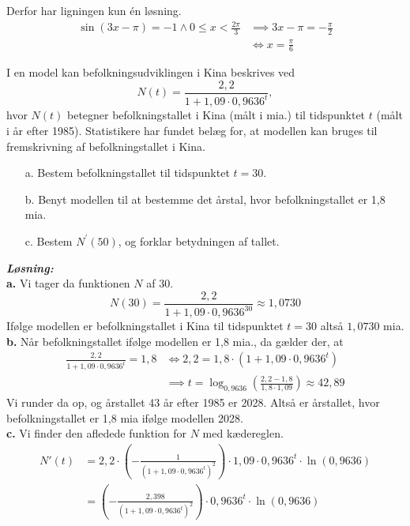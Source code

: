 \documentclass{article}
\newcommand{\sol}{\setlength{\parindent}{0cm}\textbf{\textit{Løsning:}}\setlength{\parindent}{1cm}}
\begin{document}
Derfor har ligningen kun én løsning.
\begin{equation*}
\begin{split}
  \sin \left(3x-\pi\right) =-1\land 0\leq x < \frac{2\pi}{3} &\implies 3x-\pi=-\frac{\pi}{2}\\ 
  &\iff x=\frac{\pi}{6}
\end{split}
\end{equation*}
\begin{question}{}{}
  I en model kan befolkningsudviklingen i Kina beskrives ved
$$
N(t)=\frac{2,2}{1+1,09 \cdot 0,9636^t},
$$
hvor $N(t)$ betegner befolkningstallet i Kina (målt i mia.) til tidspunktet $t$ (målt i år efter 1985). Statistikere har fundet belæg for, at modellen kan bruges til fremskrivning af befolkningstallet i Kina.
\begin{itemize}
  \item[a.] Bestem befolkningstallet til tidspunktet $t=30$.
  \item[b.] Benyt modellen til at bestemme det årstal, hvor befolkningstallet er 1,8 mia.
  \item[c.] Bestem $N^{\prime}(50)$, og forklar betydningen af tallet.
\end{itemize} 
\end{question}
\sol \\ 
\textbf{a.} Vi tager da funktionen $N$ af $30$.
\[
N(30)=\frac{2,2}{1+1,09 \cdot 0,9636^{30}} \approx 1,0730
\] 
Ifølge modellen er befolkningstallet i Kina til tidspunktet $t=30$ altså $1,0730$ mia. \\[1ex]
\textbf{b.} Når befolkningstallet ifølge modellen er 1,8 mia., da gælder der, at
\begin{equation*}
\begin{split}
  \frac{2,2}{1+1,09 \cdot 0,9636^t}=1,8 &\iff 2,2=1,8\cdot \left(1+1,09\cdot 0,9636^t\right) \\ 
  &\implies t=\log_{0,9636}\left(\frac{2,2-1,8}{1,8\cdot 1,09}\right) \approx 42,89
\end{split}
\end{equation*}
Vi runder da op, og årstallet 43 år efter 1985 er 2028.
Altså er årstallet, hvor befolkningstallet er 1,8 mia ifølge modellen 2028. \\[1ex]
\textbf{c.} Vi finder den afledede funktion for $N$ med kædereglen. 
\begin{equation*}
\begin{split}
  N'(t)&=2,2\cdot \left(-\frac{1}{\left(1+1,09\cdot 0,9636^t\right)^2}\right) \cdot 1,09 \cdot 0,9636^t\cdot \ln\left(0,9636\right) \\ 
  &=\left(-\frac{2,398}{\left(1+1,09\cdot 0,9636^t\right)^2}\right) \cdot 0,9636^t\cdot \ln\left(0,9636\right) 
\end{split}
\end{equation*}
\end{document}
